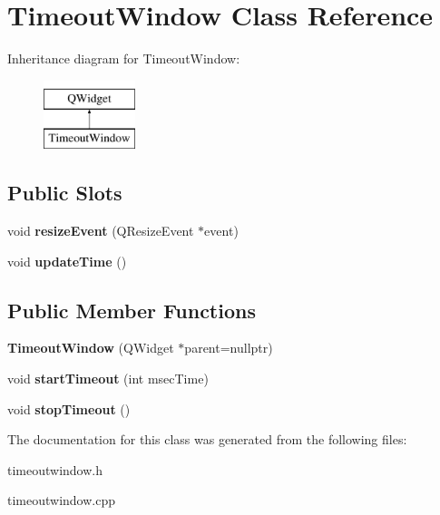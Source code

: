 \hypertarget{classTimeoutWindow}{}\section{Timeout\+Window Class Reference}
\label{classTimeoutWindow}
Inheritance diagram for Timeout\+Window\+:\begin{figure}[H]
\begin{center}
\leavevmode
\includegraphics[height=2.000000cm]{d3/d01/classTimeoutWindow}
\end{center}
\end{figure}
\subsection*{Public Slots}
\begin{DoxyCompactItemize}
\item 
\mbox{\label{classTimeoutWindow_a9098ba1a4ae520817d263ad8624d405f}} 
void {\bfseries resize\+Event} (Q\+Resize\+Event $\ast$event)
\item 
\mbox{\label{classTimeoutWindow_ad9b2544b75e849b235aebd964c7ddff4}} 
void {\bfseries update\+Time} ()
\end{DoxyCompactItemize}
\subsection*{Public Member Functions}
\begin{DoxyCompactItemize}
\item 
\mbox{\label{classTimeoutWindow_a5bfb9ad0db51f063b38cbdc38eb5def5}} 
{\bfseries Timeout\+Window} (Q\+Widget $\ast$parent=nullptr)
\item 
\mbox{\label{classTimeoutWindow_ae25558362f6afc3c3d04dbea7104efe8}} 
void {\bfseries start\+Timeout} (int msec\+Time)
\item 
\mbox{\label{classTimeoutWindow_a5b768103279ed46da38ebeb2b2a2d549}} 
void {\bfseries stop\+Timeout} ()
\end{DoxyCompactItemize}


The documentation for this class was generated from the following files\+:\begin{DoxyCompactItemize}
\item 
timeoutwindow.\+h\item 
timeoutwindow.\+cpp\end{DoxyCompactItemize}
